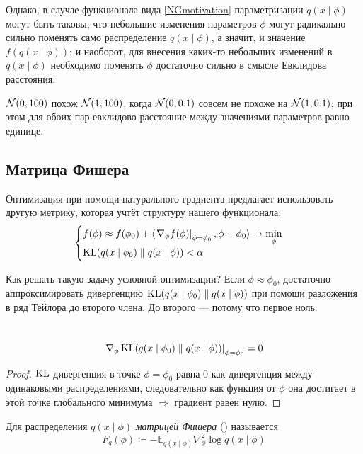 Однако, в случае функционала вида \eqref{NGmotivation} параметризации $q(x \mid \phi)$ могут быть таковы, что небольшие изменения параметров $\phi$ могут радикально сильно поменять само распределение $q(x \mid \phi)$, а значит, и значение $f(q(x \mid \phi))$; и наоборот, для внесения каких-то небольших изменений в $q(x \mid \phi)$ необходимо поменять $\phi$ достаточно сильно в смысле Евклидова расстояния.

\begin{example}
$\mathcal{N}(0, 100)$ похож $\mathcal{N}(1, 100)$, когда $\mathcal{N}(0, 0.1)$ совсем не похоже на $\mathcal{N}(1, 0.1)$; при этом для обоих пар евклидово расстояние между значениями параметров равно единице.
\end{example} 

\subsection{Матрица Фишера}

Оптимизация при помощи натурального градиента предлагает использовать другую метрику, которая учтёт структуру нашего функционала:
$$\begin{cases}
f(\phi) \approx f(\phi_0) + \langle \left. \nabla_\phi f(\phi) \right|_{\phi = \phi_0}, \phi - \phi_0 \rangle \to \min\limits_{\phi} \\
\operatorname{KL} (q(x \mid \phi_0) \parallel q(x \mid \phi)) < \alpha
\end{cases}$$

Как решать такую задачу условной оптимизации? Если $\phi \approx \phi_0$, достаточно аппроксимировать дивергенцию $\operatorname{KL} (q(x \mid \phi_0) \parallel q(x \mid \phi))$ при помощи разложения в ряд Тейлора до второго члена. До второго --- потому что первое ноль.

\begin{proposition}\,
\begin{equation*}
\left. \nabla_{\phi} \operatorname{KL} (q(x \mid \phi_0) \parallel q(x \mid \phi)) \right|_{\phi = \phi_0} = 0
\end{equation*}
\begin{proof}
$\operatorname{KL}$-дивергенция в точке $\phi = \phi_0$ равна 0 как дивергенция между одинаковыми распределениями, следовательно как функция от $\phi$ она достигает в этой точке глобального минимума $\Rightarrow$ градиент равен нулю.
\end{proof}
\end{proposition}

\begin{definition}
Для распределения $q(x \mid \phi)$ \emph{матрицей Фишера} () называется
$$F_q(\phi) \coloneqq -\mathbb{E}_{q(x \mid \phi)} \nabla^2_\phi \log q(x \mid \phi)$$
\end{definition}

